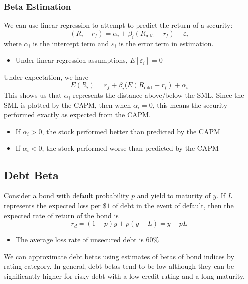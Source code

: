 \documentclass[11pt]{article}
\theoremstyle{definition}
\renewcommand{\epsilon}{\varepsilon}
\newcommand{\mkt}{\text{mkt}}
\begin{document}
\subsubsection{Beta Estimation}
We can use linear regression to attempt to predict the return of a security:
\begin{equation*}
    (R_i - r_f) = \alpha_i + \beta_i(R_{\text{mkt}} - r_f) + \varepsilon_i 
\end{equation*}
where $\alpha_i$ is the intercept term and $\epsilon_i$ is the error term in estimation.
\begin{itemize}
    \item Under linear regression assumptions, $E[\varepsilon_i] = 0$
\end{itemize}
Under expectation, we have 
\begin{equation*}
    E(R_i) = r_f + \beta_i (E(R_\mkt - r_f) + \alpha_i
\end{equation*}
This shows us that $\alpha_i$ represents the distance above/below the SML. Since the SML is plotted by the CAPM, then when $\alpha_i = 0$, this means the security performed exactly as expected from the CAPM.
\begin{itemize}
    \item If $\alpha_i > 0$, the stock performed better than predicted by the CAPM
    \item If $\alpha_i < 0$, the stock performed worse than predicted by the CAPM
\end{itemize}

\subsection{Debt Beta}
Consider a bond with default probability $p$ and yield to maturity of $y$. If $L$ represents the expected loss per $\$1$ of debt in the event of default, then the expected rate of return of the bond is 
\begin{equation*}
    r_d = (1 - p)y + p(y - L) = y - pL
\end{equation*}
\begin{itemize}
    \item The average loss rate of unsecured debt is $60\%$
\end{itemize}
We can approximate debt betas using estimates of betas of bond indices by rating category. In general, debt betas tend to be low although they can be significantly higher for risky debt with a low credit rating and a long maturity.
\end{document}
